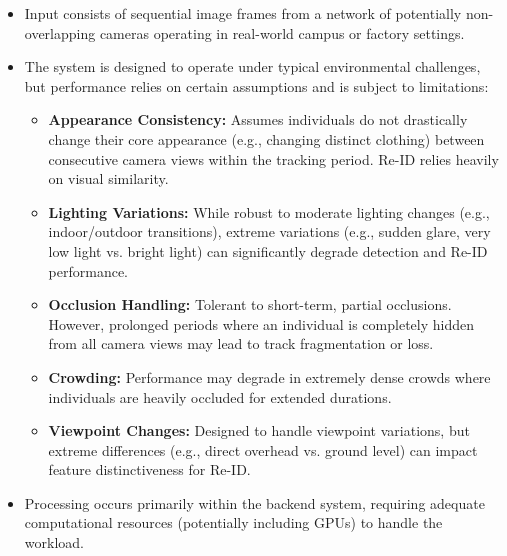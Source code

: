\begin{itemize}
\begin{itemize}
            \item Input consists of sequential image frames from a network of potentially non-overlapping cameras operating in real-world campus or factory settings.
            \item The system is designed to operate under typical environmental challenges, but performance relies on certain assumptions and is subject to limitations:
                \begin{itemize}
                    \item \textbf{Appearance Consistency:} Assumes individuals do not drastically change their core appearance (e.g., changing distinct clothing) between consecutive camera views within the tracking period. Re-ID relies heavily on visual similarity.
                    \item \textbf{Lighting Variations:} While robust to moderate lighting changes (e.g., indoor/outdoor transitions), extreme variations (e.g., sudden glare, very low light vs. bright light) can significantly degrade detection and Re-ID performance.
                    \item \textbf{Occlusion Handling:} Tolerant to short-term, partial occlusions. However, prolonged periods where an individual is completely hidden from all camera views may lead to track fragmentation or loss.
                    \item \textbf{Crowding:} Performance may degrade in extremely dense crowds where individuals are heavily occluded for extended durations.
                    \item \textbf{Viewpoint Changes:} Designed to handle viewpoint variations, but extreme differences (e.g., direct overhead vs. ground level) can impact feature distinctiveness for Re-ID.
                \end{itemize}
            \item Processing occurs primarily within the backend system, requiring adequate computational resources (potentially including GPUs) to handle the workload.
        \end{itemize}
\end{itemize}

